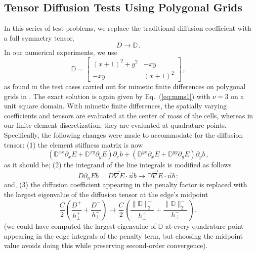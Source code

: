 \documentclass[preprint,10pt]{elsarticle}
\newcommand{\grad}{\vec{\nabla}}
\newcommand{\vn}{\vec{n}}
\newcommand{\eig}[1]{\| #1 \|_2}
\newcommand{\eqt}[1]{Eq.~(\ref{#1})}                     %
\newcommand{\tf}{b}
\begin{document}
\pagebreak

\subsection{Tensor Diffusion Tests Using Polygonal Grids} \label{sec:results_tens}

In this series of test problems, we replace the traditional diffusion coefficient with a full symmetry tensor,
\begin{equation}
  D \longrightarrow \mathbb{D} \,.
\end{equation}
In our numerical experiments, we use
\begin{equation}
  \mathbb{D}  =  
  \begin{bmatrix}
  (x+1)^2+y^2 & -xy \\
    -xy       & (x+1)^2
  \end{bmatrix}
  \, ,
\end{equation}
as found in the test cases carried out for mimetic finite differences on polygonal grids in \cite{Kuznetsov2004,Brezzi2005}.
The exact solution is again given by \eqt{eq:mms1} with $\nu=3$ on a unit square domain.
With mimetic finite differences, the spatially varying coefficients and tensors are evaluated at the center of mass of
the cells, whereas in our finite element discretization, they are evaluated at quadrature points. Specifically,
the following changes were made to accommodate for the diffusion tensor: (1) the element stiffness matrix is now
\begin{equation}
  \left( \mathbb{D}^{xx} \partial_x E +\mathbb{D}^{xy} \partial_y E \right) \partial_x \tf +
  \left( \mathbb{D}^{yx} \partial_x E +\mathbb{D}^{yy} \partial_y E \right) \partial_y \tf  \, ,
 \end{equation}
as it should be; (2) the integrand of the line integrals is modified as follows
\begin{equation}
 D\partial_n E \tf  = D\grad E \cdot \vn \tf  \longrightarrow  \mathbb{D}\grad E \cdot \vn \tf \, ;
\end{equation}
and, (3) the diffusion coefficient appearing in the penalty factor is replaced with the largest eigenvalue of
the diffusion tensor at the edge's midpoint
\begin{equation}
\frac{C}{2} \left( \frac{D^+}{h_\bot^+} + \frac{D^-}{h_\bot^-} \right)
 \longrightarrow  \frac{C}{2} \left( \frac{\eig{\mathbb{D}}^+}{h_\bot^+} + \frac{\eig{\mathbb{D}}^-}{h_\bot^-} \right)
 \, ,
\end{equation}
(we could have computed the largest eigenvalue of $\mathbb{D}$ at every quadrature point appearing in the edge
integrals of the penalty term, but choosing the midpoint value avoids doing this while preserving second-order convergence).
\end{document}
